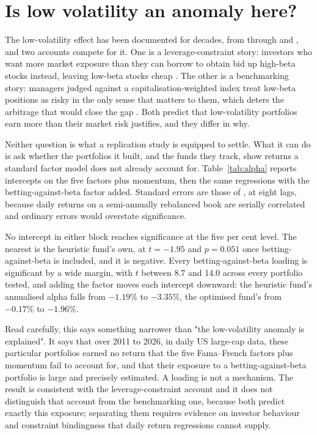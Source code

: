 \section{Is low volatility an anomaly here?}
\label{sec:anomaly}
The low-volatility effect has been documented for decades, from
\citet{haugen1991efficient} through \citet{ang2006crosssection} and
\citet{blitz2007volatility}, and two accounts compete for it. One is a
leverage-constraint story: investors who want more market exposure than they
can borrow to obtain bid up high-beta stocks instead, leaving low-beta stocks
cheap \citep{frazzini2014betting}. The other is a benchmarking story: managers
judged against a capitalisation-weighted index treat low-beta positions as
risky in the only sense that matters to them, which deters the arbitrage that
would close the gap \citep{baker2011benchmarks}. Both predict that
low-volatility portfolios earn more than their market risk justifies, and they
differ in why.

Neither question is what a replication study is equipped to settle. What it can
do is ask whether the portfolios it built, and the funds they track, show
returns a standard factor model does not already account for.
Table~\ref{tab:alpha} reports intercepts on the \citet{fama2015five} five
factors plus momentum, then the same regressions with the
betting-against-beta factor added. Standard errors are those of
\citet{newey1987simple}, at eight lags, because daily returns on a
semi-annually rebalanced book are serially correlated and ordinary errors would
overstate significance.



No intercept in either block reaches significance at the five per cent level.
The nearest is the heuristic fund's own, at $t=-1.95$ and $p=0.051$ once
betting-against-beta is included, and it is negative. Every
betting-against-beta loading is significant by a wide margin, with $t$ between
8.7 and 14.0 across every portfolio tested, and adding the factor moves each
intercept downward: the heuristic fund's annualised alpha falls from $-1.19\%$
to $-3.35\%$, the optimised fund's from $-0.17\%$ to $-1.96\%$.

Read carefully, this says something narrower than "the low-volatility anomaly
is explained". It says that over 2011 to 2026, in daily US large-cap data,
these particular portfolios earned no return that the five Fama--French factors
plus momentum fail to account for, and that their exposure to a
betting-against-beta portfolio is large and precisely estimated. A loading is
not a mechanism. The result is consistent with the leverage-constraint account
and it does not distinguish that account from the benchmarking one, because
both predict exactly this exposure; separating them requires evidence on
investor behaviour and constraint bindingness that daily return regressions
cannot supply.

